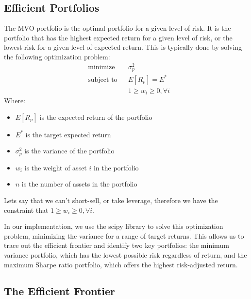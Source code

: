 \subsection{Efficient Portfolios}
The MVO portfolio is the optimal portfolio for a given level of risk. 
It is the portfolio that has the highest expected return for a given level of risk, or the lowest risk for a given level of expected return.
This is typically done by solving the following optimization problem:
\begin{equation}
    \label{eq:mvo_optimization}
    \begin{aligned}
        & \text{minimize} && \sigma_p^2 \\
        & \text{subject to} && E[R_p] = E^* \\
        & && 1\geq w_i \geq 0, \forall i
    \end{aligned}
\end{equation}
Where:
\begin{itemize}
    \item $E[R_p]$ is the expected return of the portfolio
    \item $E^*$ is the target expected return
    \item $\sigma_p^2$ is the variance of the portfolio
    \item $w_i$ is the weight of asset $i$ in the portfolio
    \item $n$ is the number of assets in the portfolio
\end{itemize}

Lets say that we can't short-sell, or take leverage, therefore we have the constraint that $1 \geq w_i \geq 0, \forall i$.

In our implementation, we use the scipy library to solve this optimization problem, minimizing the variance for a range of target returns. This allows us to trace out the efficient frontier and identify two key portfolios: the minimum variance portfolio, which has the lowest possible risk regardless of return, and the maximum Sharpe ratio portfolio, which offers the highest risk-adjusted return.

\subsection{The Efficient Frontier}

